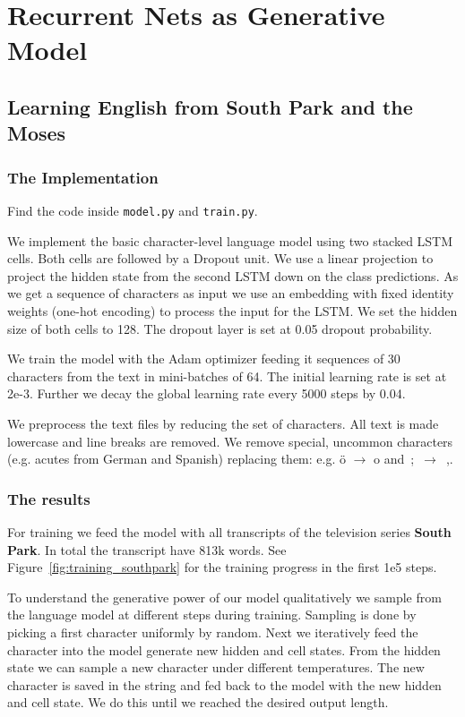 \documentclass{article}
\begin{document}
\section{Recurrent Nets as Generative Model}
\subsection{Learning English from South Park and the Moses}
\subsubsection{The Implementation}
Find the code inside \texttt{model.py} and \texttt{train.py}.

We implement the basic character-level language model using two stacked LSTM cells.
Both cells are followed by a Dropout unit.
We use a linear projection to project the hidden state from the second LSTM down on the class predictions.
As we get a sequence of characters as input we use an embedding with fixed identity weights (one-hot encoding) to process the input for the LSTM.
We set the hidden size of both cells to 128.
The dropout layer is set at 0.05 dropout probability.

We train the model with the Adam optimizer feeding it sequences of 30 characters from the text in mini-batches of 64.
The initial learning rate is set at 2e-3.
Further we decay the global learning rate every 5000 steps by 0.04.

We preprocess the text files by reducing the set of characters.
All text is made lowercase and line breaks are removed.
We remove special, uncommon characters (e.g. acutes from German and Spanish) replacing them: e.g. ö \(\to\) o and\ ;\ \(\to\)\ ,.

\subsubsection{The results}
For training we feed the model with all transcripts of the television series \textbf{South Park}.
In total the transcript have 813k words.
See Figure~\ref{fig:training_southpark} for the training progress in the first 1e5 steps.

To understand the generative power of our model qualitatively we sample from the language model at different steps during training.
Sampling is done by picking a first character uniformly by random.
Next we iteratively feed the character into the model generate new hidden and cell states.
From the hidden state we can sample a new character under different temperatures.
The new character is saved in the string and fed back to the model with the new hidden and cell state.
We do this until we reached the desired output length.
\end{document}
